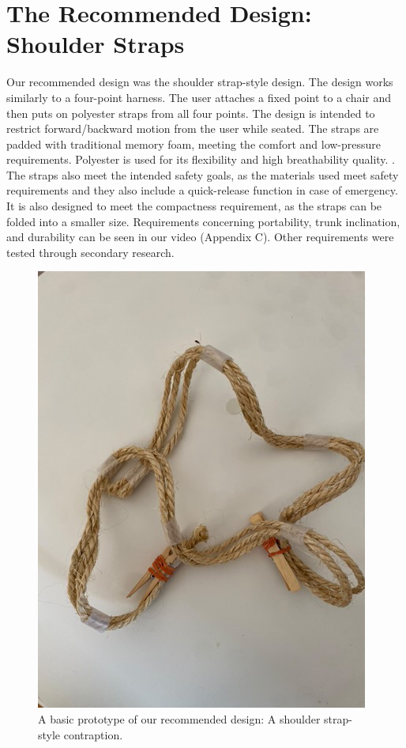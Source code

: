 \documentclass[11pt]{article}
\begin{document}
\section{The Recommended Design: Shoulder Straps}

Our recommended design was the shoulder strap-style design. The design works similarly to a four-point harness. The user attaches a fixed point to a chair and then puts on polyester straps from all four points. The design is intended to restrict forward/backward motion from the user while seated. The straps are padded with traditional memory foam, meeting the comfort and low-pressure requirements. Polyester is used for its flexibility and high breathability quality. \cite{RefWorks:73}. The straps also meet the intended safety goals, as the materials used meet safety requirements and they also include a quick-release function in case of emergency. It is also designed to meet the compactness requirement, as the straps can be folded into a smaller size. Requirements concerning portability, trunk inclination, and durability can be seen in our video (Appendix C). Other requirements were tested through secondary research. 
\begin{figure}[H]
    \centering
        \includegraphics[scale=0.5]{suspenders.jpg}
        \caption{A basic prototype of our recommended design: A shoulder strap-style contraption.}
        \label{fig:suspenders}

\end{figure}
\end{document}
